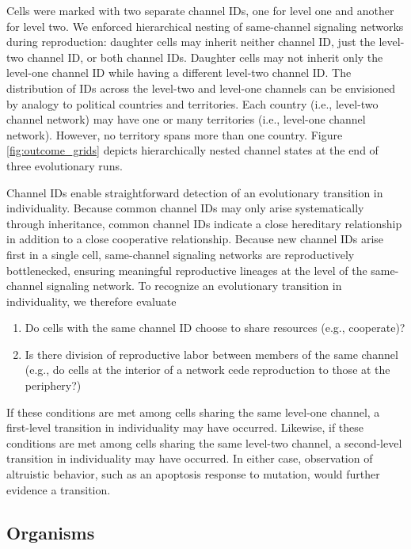 Cells were marked with two separate channel IDs, one for level one and another for level two.
We enforced hierarchical nesting of same-channel signaling networks during reproduction:
daughter cells may inherit neither channel ID, just the level-two channel ID, or both channel IDs.
Daughter cells may not inherit only the level-one channel ID while having a different level-two channel ID.
The distribution of IDs across the level-two and level-one channels can be envisioned by analogy to political countries and territories.
Each country (i.e., level-two channel network) may have one or many territories (i.e., level-one channel network).
However, no territory spans more than one country.
Figure \ref{fig:outcome_grids} depicts hierarchically nested channel states at the end of three evolutionary runs.

Channel IDs enable straightforward detection of an evolutionary transition in individuality.
Because common channel IDs may only arise systematically through inheritance, common channel IDs indicate a close hereditary relationship in addition to a close cooperative relationship.
Because new channel IDs arise first in a single cell, same-channel signaling networks are reproductively bottlenecked, ensuring meaningful reproductive lineages at the level of the same-channel signaling network.
To recognize an evolutionary transition in individuality, we therefore evaluate
\begin{enumerate}
\item Do cells with the same channel ID choose to share resources (e.g., cooperate)?
\item Is there division of reproductive labor between members of the same channel (e.g., do cells at the interior of a network cede reproduction to those at the periphery?)
\end{enumerate}
If these conditions are met among cells sharing the same level-one channel, a first-level transition in individuality may have occurred.
Likewise, if these conditions are met among cells sharing the same level-two channel, a second-level transition in individuality may have occurred.
In either case, observation of altruistic behavior, such as an apoptosis response to mutation, would further evidence a transition.

\subsection{Organisms}



